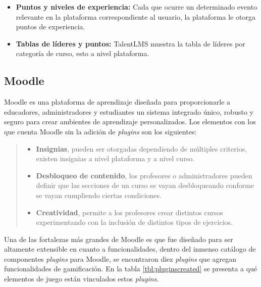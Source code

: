 \begin{multicols*}{2}
\begin{itemize}
        \item {\bf Puntos y niveles de experiencia:} Cada que ocurre un
            determinado evento relevante en la plataforma correspondiente al
            usuario, la plataforma le otorga puntos de experiencia.

        \item {\bf Tablas de líderes y puntos:} TalentLMS muestra la
            tabla de líderes por categoría de curso, esto a nivel plataforma.

    \end{itemize}

\end{multicols*}



\clearpage
\subsection{Moodle}

 Moodle \cite{PagMoodle} es una plataforma de aprendizaje diseñada para proporcionarle
 a educadores, administradores y estudiantes un sistema integrado único, robusto y seguro
 para crear ambientes de aprendizaje personalizados. Los elementos con los que cuenta
 Moodle sin la adición de {\it plugins} son los siguientes:

 \begin{quote}
 \begin{itemize}
    \item {\bf Insignias}, pueden ser otorgadas dependiendo de múltiples criterios,
                existen insignias a nivel plataforma y a nivel curso.

    \item {\bf Desbloqueo de contenido}, los profesores o administradores pueden
                definir que las secciones de un curso se vayan desbloqueando
                conforme se vayan cumpliendo ciertas condiciones.

    \item {\bf Creatividad}, permite a los profesores crear distintos cursos
                experimentando con la inclusión de distintos tipos de ejercicios.
 \end{itemize}
 \end{quote}

 \noindent Una de las fortalezas más grandes de Moodle es que fue diseñado para ser altamente
 extensible en cuanto a funcionalidades, dentro del inmenso catálogo de componentes {\it plugins}
 para Moodle, se encontraron diez {\it plugins} que agregan funcionalidades de gamificación. En la tabla
 \ref{tbl:pluginscreated} se presenta a qué elementos de juego están vinculados estos {\it plugins}.


